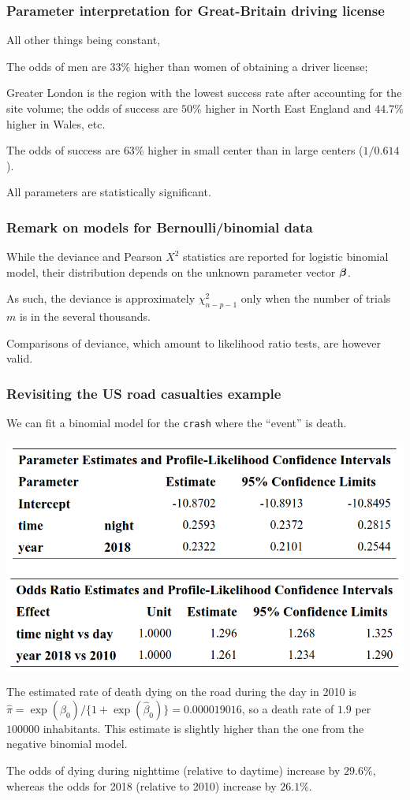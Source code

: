 \documentclass{beamer}
\begin{document}
\begin{frame}
 \frametitle{Parameter interpretation for Great-Britain driving license}
 All other things being constant,
 \bi \item The odds of men are $33\%$ higher than women of obtaining a driver license;
 \item Greater London is the region with the lowest success rate after accounting for the site volume; the odds of success are $50\%$ higher in North East England and $44.7\%$ higher in Wales, etc.
  \item The odds of success are $63\%$ higher in small center than in large centers ($1/0.614$).
  \item All parameters are statistically significant.
 \ei 
\end{frame}


\begin{frame}
 \frametitle{Remark on models for Bernoulli/binomial data}
 \bi \item While the deviance and Pearson $X^2$ statistics are reported for logistic binomial model, their distribution depends on the unknown parameter vector $\boldsymbol {\beta}$.
 \item As such, the deviance is approximately $\chi^2_{n-p-1}$ only when the number of trials $m$ is in the several thousands.
 \item Comparisons of deviance, which amount to likelihood ratio tests, are however valid.
  \ei
\end{frame}

\begin{frame}
 \frametitle{Revisiting the US road casualties example}
 We can fit a binomial model for the \texttt{crash} where the ``event'' is death.
 
 \begin{center}
  \includegraphics[width = 0.7\linewidth]{img/c4/slides8-e24}
 \end{center}
 {\small
\bi \item The estimated rate of death dying on the road during the day in 2010 is
$\hat{\pi}=\exp(\hat{\beta}_0)/\{1+\exp(\hat{\beta}_0)\} = 0.000019016$, so a death rate of $1.9$ per $100 000$ inhabitants. This estimate is slightly higher than the one from the negative binomial model.
\item The odds of dying during nighttime (relative to daytime) increase by $29.6\%$, whereas the odds for 2018 (relative to 2010) increase by $26.1\%$.
\ei
}
\end{frame}
\end{document}
